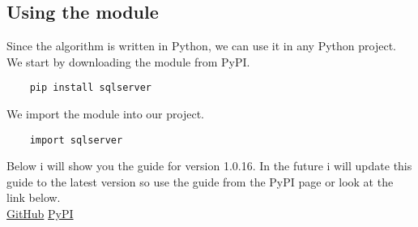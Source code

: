 \subsection{Using the module}

Since the algorithm is written in Python, we can use it in any Python project. \\

We start by downloading the module from PyPI. \\
\begin{verbatim}
    pip install sqlserver
\end{verbatim}

We import the module into our project. \\
\begin{verbatim}
    import sqlserver
\end{verbatim}

Below i will show you the guide for version 1.0.16. In the future i will update this guide to the latest version so use the guide from the PyPI page or look at the link below. \\

\href{https://github.com/adgsenpai/pythonsqlserverclass}{GitHub}
\href{https://pypi.org/project/sqlserver/}{PyPI}

